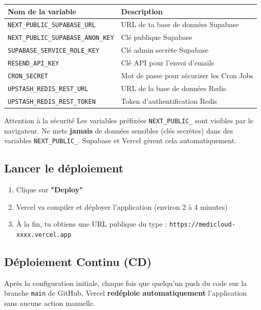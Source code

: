 \documentclass[12pt, a4paper]{article}
\begin{document}
\begin{center}
\begin{tabular}{ll}
  \toprule
  \textbf{Nom de la variable} & \textbf{Description} \\
  \midrule
  \texttt{NEXT\_PUBLIC\_SUPABASE\_URL} & URL de ta base de données Supabase \\
  \texttt{NEXT\_PUBLIC\_SUPABASE\_ANON\_KEY} & Clé publique Supabase \\
  \texttt{SUPABASE\_SERVICE\_ROLE\_KEY} & Clé admin secrète Supabase \\
  \texttt{RESEND\_API\_KEY} & Clé API pour l'envoi d'emails \\
  \texttt{CRON\_SECRET} & Mot de passe pour sécuriser les Cron Jobs \\
  \texttt{UPSTASH\_REDIS\_REST\_URL} & URL de la base de données Redis \\
  \texttt{UPSTASH\_REDIS\_REST\_TOKEN} & Token d'authentification Redis \\
  \bottomrule
\end{tabular}
\end{center}

\begin{warnbox}{Attention à la sécurité}
  Les variables préfixées \texttt{NEXT\_PUBLIC\_} sont visibles par le navigateur.
  Ne mets \textbf{jamais} de données sensibles (clés secrètes) dans des variables
  \texttt{NEXT\_PUBLIC\_}. Supabase et Vercel gèrent cela automatiquement.
\end{warnbox}

\subsection{Lancer le déploiement}

\begin{enumerate}[label=\arabic*.]
  \item Clique sur \textbf{"Deploy"}
  \item Vercel va compiler et déployer l'application (environ 2 à 4 minutes)
  \item À la fin, tu obtiens une URL publique du type :
        \texttt{https://medicloud-xxxx.vercel.app}
\end{enumerate}

\subsection{Déploiement Continu (CD)}

Après la configuration initiale, chaque fois que quelqu'un push du code
sur la branche \texttt{main} de GitHub, Vercel \textbf{redéploie automatiquement}
l'application sans aucune action manuelle.
\end{document}
